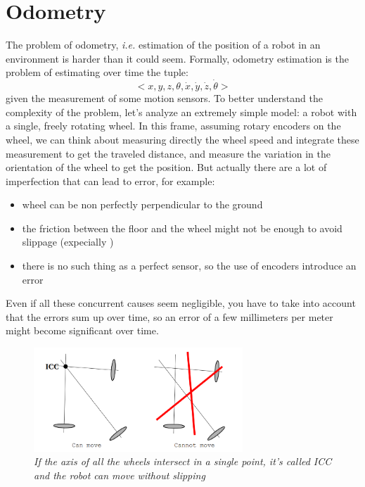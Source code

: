 \section{Odometry}\label{sec:odometry}

The problem of odometry, \textit{i.e.} estimation of the position of a robot in an environment is harder than it could seem. Formally, odometry estimation is the problem of estimating over time the tuple: 
\begin{equation}
	<x, y, z, \theta,\dot{x}, \dot{y}, \dot{z}, \dot{\theta}>
	\label{eq:odometryTuple}
\end{equation} 
given the measurement of some motion sensors. 
To better understand the complexity of the problem, let's analyze an extremely simple model: a robot with a single, freely rotating wheel. In this frame, assuming rotary encoders on the wheel, we can think about measuring directly the wheel speed and integrate these measurement to get the traveled distance, and measure the variation in the orientation of the wheel to get the position. But actually there are a lot of imperfection that can lead to error, for example:
	\begin{itemize}
		\item wheel can be non perfectly perpendicular to the ground
		\item the friction between the floor and the wheel might not be enough to avoid slippage (expecially )
		\item there is no such thing as a perfect sensor, so the use of encoders introduce an error
	\end{itemize}
Even if all these concurrent causes seem negligible, you have to take into account that the errors sum up over time, so an error of a few millimeters per meter might become significant over time. \\ 

\begin{figure}
	\centering
	\includegraphics[width=0.7\textwidth]{Images/background_and_tools/icc.png}
	\caption{\textit{If the axis of all the wheels intersect in a single point, it's called ICC and the robot can move without slipping}}
	\label{fig:icc}
\end{figure}

